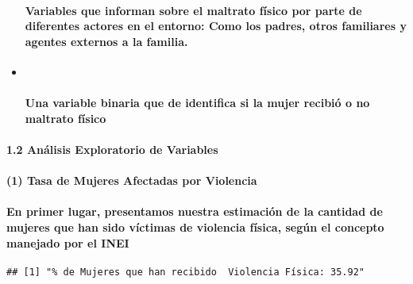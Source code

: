 \documentclass[]{article}
\let\oldparagraph\paragraph
\renewcommand{\paragraph}[1]{\oldparagraph{#1}\mbox{}}
\begin{document}
\begin{itemize}
  \paragraph{\texorpdfstring{\textbf{Variables que informan sobre el
  maltrato físico por parte de diferentes actores en el entorno}: Como
  los padres, otros familiares y agentes externos a la
  familia.}{Variables que informan sobre el maltrato físico por parte de diferentes actores en el entorno: Como los padres, otros familiares y agentes externos a la familia.}}\label{variables-que-informan-sobre-el-maltrato-fisico-por-parte-de-diferentes-actores-en-el-entorno-como-los-padres-otros-familiares-y-agentes-externos-a-la-familia.}
\item ~
  \paragraph{\texorpdfstring{Una variable binaria que de identifica si
  la mujer \textbf{recibió o no maltrato
  físico}}{Una variable binaria que de identifica si la mujer recibió o no maltrato físico}}\label{una-variable-binaria-que-de-identifica-si-la-mujer-recibio-o-no-maltrato-fisico}
\end{itemize}

\paragraph{1.2 Análisis Exploratorio de
Variables}\label{analisis-exploratorio-de-variables}

\paragraph{(1) Tasa de Mujeres Afectadas por
Violencia}\label{tasa-de-mujeres-afectadas-por-violencia}

\paragraph{En primer lugar, presentamos nuestra estimación de la
cantidad de mujeres que han sido víctimas de violencia física, según el
concepto manejado por el
INEI}\label{en-primer-lugar-presentamos-nuestra-estimacion-de-la-cantidad-de-mujeres-que-han-sido-victimas-de-violencia-fisica-segun-el-concepto-manejado-por-el-inei}

\begin{verbatim}
## [1] "% de Mujeres que han recibido  Violencia Física: 35.92"
\end{verbatim}
\end{document}
